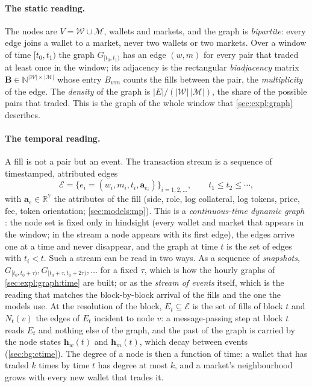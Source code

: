 \paragraph{The static reading.}  The nodes are $V = \mathcal{W} \cup \mathcal{M}$, wallets
and markets, and the graph is \emph{bipartite}: every edge joins a wallet to a market,
never two wallets or two markets.  Over a window of time $[t_0, t_1)$ the graph
$G_{[t_0, t_1)}$ has an edge $(w, m)$ for every pair that traded at least once in the
window; its adjacency is the rectangular \emph{biadjacency} matrix
$\mathbf{B} \in \mathbb{N}^{|\mathcal{W}| \times |\mathcal{M}|}$ whose entry $B_{wm}$ counts
the fills between the pair, the \emph{multiplicity} of the edge.  The \emph{density} of the
graph is $|E| / (|\mathcal{W}|\,|\mathcal{M}|)$, the share of the possible pairs that
traded.  This is the graph of the whole window that \cref{sec:expl:graph} describes.

\paragraph{The temporal reading.}  A fill is not a pair but an event.  The transaction
stream is a sequence of timestamped, attributed edges
\begin{equation}
  \mathcal{E} = \bigl\{ e_i = (w_i, m_i, t_i, \mathbf{a}_{e_i}) \bigr\}_{i = 1, 2, \ldots},
  \qquad t_1 \le t_2 \le \cdots,
  \label{eq:temporal-graph}
\end{equation}
with $\mathbf{a}_{e} \in \mathbb{R}^{7}$ the attributes of the fill (side, role, log collateral,
log tokens, price, fee, token orientation; \cref{sec:models:mp}).  This is a \emph{continuous-time dynamic
graph} \cite{kazemi2020survey,gravina2024dynamic}: the node set is fixed only in hindsight
(every wallet and market that appears in the window; in the stream a node appears with its
first edge), the edges arrive one at a time and never disappear,
and the graph at time $t$ is the set of edges with $t_i < t$.  Such a stream can be read in
two ways.  As a sequence of \emph{snapshots}, $G_{[t_0, t_0 + \tau)}, G_{[t_0 + \tau, t_0 +
2\tau)}, \ldots$ for a fixed $\tau$, which is how the hourly graphs of
\cref{sec:expl:graph:time} are built; or as the \emph{stream of events} itself, which is
the reading that matches the block-by-block arrival of the fills and the one the models
use.  At the resolution of the block, $E_t \subseteq \mathcal{E}$ is the set of fills of
block $t$ and $N_t(v)$ the edges of $E_t$ incident to node $v$: a message-passing step at
block $t$ reads $E_t$ and nothing else of the graph, and the past of the graph is carried
by the node states $\mathbf{h}_w(t)$ and $\mathbf{h}_m(t)$, which decay between events
(\cref{sec:bg:ctime}).  The degree of a node is then a function of time: a wallet that has
traded $k$ times by time $t$ has degree at most $k$, and a market's neighbourhood grows
with every new wallet that trades it.

